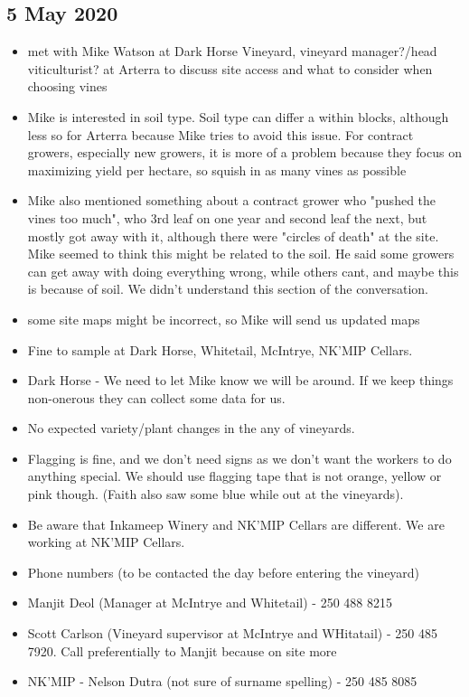 \documentclass[11pt,letter]{article}
\newenvironment{smitemize}{
\begin{itemize}
  \setlength{\itemsep}{0pt}
  \setlength{\parskip}{0.8pt}
  \setlength{\parsep}{0pt}}
{\end{itemize}
}
\begin{document}
\subsection{5 May 2020}
\begin{smitemize}
\item met with Mike Watson at Dark Horse Vineyard, vineyard manager?/head viticulturist? at Arterra to discuss site access and what to consider when choosing vines
\item Mike is interested in soil type. Soil type can differ a within blocks, although less so for Arterra because Mike tries to avoid this issue. For contract growers, especially new growers, it is more of a problem because they focus on maximizing yield per hectare, so squish in as many vines as possible
\item Mike also mentioned something about a contract grower who "pushed the vines too much", who 3rd leaf on one year and second leaf the next, but mostly got away with it, although there were "circles of death" at the site. Mike seemed to think this might be related to the soil. He said some growers can get away with doing everything wrong, while others cant, and maybe this is because of soil. We didn't understand this section of the conversation.
\item some site maps might be incorrect, so Mike will send us updated maps
\item Fine to sample at Dark Horse, Whitetail, McIntrye, NK'MIP Cellars.
\item Dark Horse - We need to let Mike know we will be around. If we keep things non-onerous they can collect some data for us.
\item No expected variety/plant changes in the any of vineyards.
\item Flagging is fine, and we don't need signs as we don't want the workers to do anything special. We should use flagging tape that is not orange, yellow or pink though. (Faith also saw some blue while out at the vineyards).
\item Be aware that Inkameep Winery and NK'MIP Cellars are different. We are working at NK'MIP Cellars.
\item Phone numbers (to be contacted the day before entering the vineyard)
\item Manjit Deol (Manager at McIntrye and Whitetail) - 250 488 8215
\item Scott Carlson (Vineyard supervisor at McIntrye and WHitatail) - 250 485 7920. Call preferentially to Manjit because on site more
\item NK'MIP - Nelson Dutra (not sure of surname spelling) - 250 485 8085

\end{smitemize}
\end{document}
